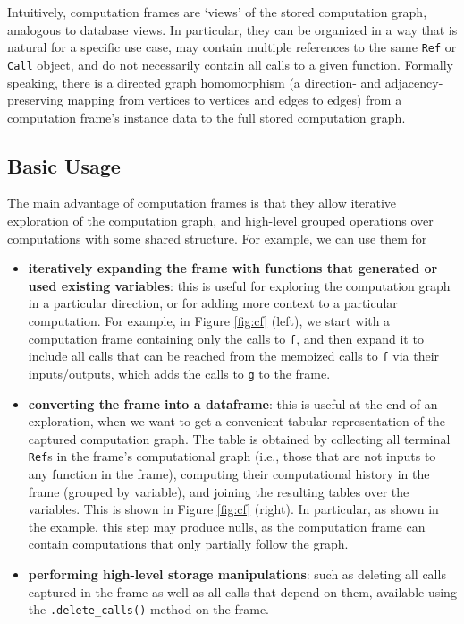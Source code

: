 \documentclass{article} %
\begin{document}
Intuitively, computation frames are `views' of the stored computation graph,
analogous to database views. In particular, they can be organized in a way that
is natural for a specific use case, may contain multiple references to the same
\texttt{Ref} or \texttt{Call} object, and do not necessarily contain all calls
to a given function. Formally speaking, there is a directed graph homomorphism
(a direction- and adjacency-preserving mapping from vertices to vertices and
edges to edges) from a computation frame's instance data to the full stored
computation graph.

\subsection{Basic Usage}
\label{subsection:}

The main advantage of computation frames is that they allow iterative
exploration of the computation graph, and high-level grouped operations over
computations with some shared structure. For example, we can use them for 
\begin{itemize}
\item \textbf{iteratively expanding the frame with functions that generated or
used existing variables}: this is useful for exploring the computation graph in
a particular direction, or for adding more context to a particular computation.
For example, in Figure \ref{fig:cf} (left), we start with a computation frame
containing only the calls to \texttt{f}, and then expand it to include all calls
that can be reached from the memoized calls to \texttt{f} via their
inputs/outputs, which adds the calls to \texttt{g} to the frame.
\item \textbf{converting the frame into a dataframe}: this is useful at the end
of an exploration, when we want to get a convenient tabular representation of
the captured computation graph. The table is obtained by collecting all terminal
\texttt{Ref}s in the frame's computational graph (i.e., those that are not
inputs to any function in the frame), computing their computational history in
the frame (grouped by variable), and joining the resulting tables over the
variables. This is shown in Figure \ref{fig:cf} (right). In particular, as shown
in the example, this step may produce nulls, as the computation frame can
contain computations that only partially follow the graph.
\item \textbf{performing high-level storage manipulations}: such as deleting all
calls captured in the frame as well as all calls that depend on them, available
using the \verb|.delete_calls()| method on the frame.
\end{itemize}
\end{document}

